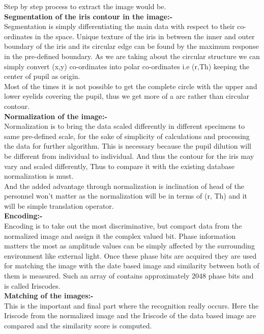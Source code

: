 \documentclass{report}
\begin{document}
\noindent Step by step process to extract the image would be.\\ 

\noindent \textbf{Segmentation of the iris contour in the image:-}\\
\noinedt Segmentation is simply differentiating the main data with respect to their co-ordinates in the space. Unique texture of the iris in between the inner and outer boundary of the iris and its circular edge can be found by the maximum response in the pre-defined boundary. As we are taking about the circular structure we can simply convert (x,y) co-ordinates into polar co-ordinates i.e (r,Th) keeping the center of pupil as origin.\\
\noindent Most of the times it is not possible to get the complete circle with the upper and lower eyelids covering the pupil, thus we get more of a arc rather than circular contour.\\

\noindent \textbf{Normalization of the image:-}\\
Normalization is to bring the data scaled differently in different specimens to same pre-defined scale, for the sake of simplicity of calculations and processing the data for further algorithm. This is necessary because the pupil dilution will be different from individual to individual. And thus the contour for the iris may vary and scaled differently, Thus to compare it with the existing database normalization is must.\\
And the added advantage through normalization is inclination of head of the personnel won’t matter as the normalization will be in terms of (r, Th) and it will be simple translation operator.\\

\noindent \textbf{Encoding:-}\\
Encoding is to take out the most discriminative, but compact data from the normalized image and assign it the complex valued bit. Phase information matters the most as amplitude values can be simply affected by the surrounding environment like external light. Once these phase bits are acquired they are used for matching the image with the date based image and similarity between both of them is measured. Such an array of contains approximately 2048 phase bits and is called Iriscodes.\\

\noindent \textbf{Matching of the images:-}\\
This is the important and final part where the recognition really occurs. Here the Iriscode from the normalized image and the Iriscode of the data based image are compared and the similarity score is computed.\\
\end{document}
